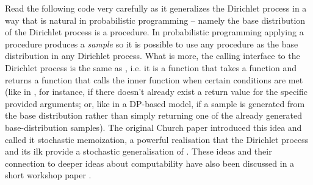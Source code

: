 \documentclass[11pt,reqno]{amsart}
\newcommand{\+}[1]{\ensuremath{{\mathbf{#1}}}}
\begin{document}
Read the following code very carefully as it generalizes the Dirichlet process in a way that is natural in probabilistic programming -- namely the base distribution of the Dirichlet process is a procedure.  In probabilistic programming applying a procedure produces a {\em sample} so it is possible to use any procedure as the base distribution in any Dirichlet process.   What is more, the calling interface to the Dirichlet process is the same as , i.e. it is a function that takes a function and returns a function that calls the inner function when certain conditions are met (like in , for instance, if there doesn't already exist a return value for the specific provided arguments; or, like in a DP-based model, if a sample is generated from the base distribution rather than simply returning  one of the already generated base-distribution samples).  The original Church paper \citep{goodman2008church} introduced this idea and called it stochastic memoization, a powerful realisation that the Dirichlet process and its ilk provide a stochastic generalisation of .  These ideas and their connection to deeper ideas about computability have also been discussed in a short workshop paper \citep{roy2008stochastic}.
\end{document}
